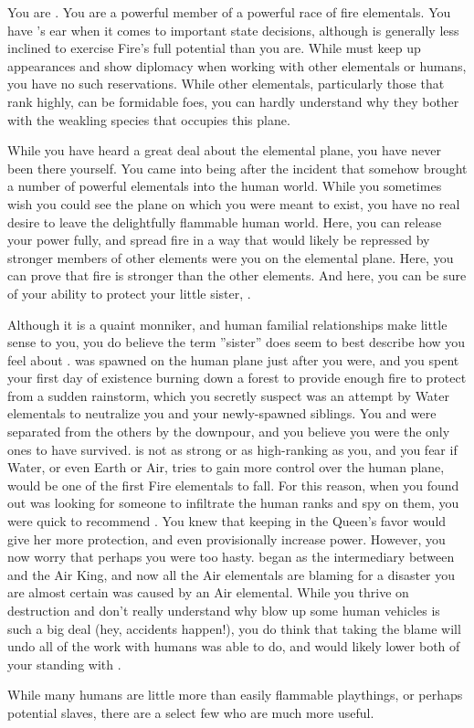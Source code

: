 \documentclass[char]{elementals}
\begin{document}
\name{\cPyro{}}

You are \cPyro{\intro}.  You are a powerful member of a powerful race of fire elementals.  You have \cfireQueen{\intro}'s ear when it comes to important state decisions, although \cfireQueen{\they} is generally less inclined to exercise Fire's full potential than you are.  While \cfireQueen{\they} must keep up appearances and show diplomacy when working with other elementals or humans, you have no such reservations.  While other elementals, particularly those that rank highly, can be formidable foes, you can hardly understand why they bother with the weakling species that occupies this plane.

While you have heard a great deal about the elemental plane, you have never been there yourself.  You came into being after the incident that somehow brought a number of powerful elementals into the human world.  While you sometimes wish you could see the plane on which you were meant to exist, you have no real desire to leave the delightfully flammable human world.  Here, you can release your power fully, and spread fire in a way that would likely be repressed by stronger members of other elements were you on the elemental plane.  Here, you can prove that fire is stronger than the other elements.  And here, you can be sure of your ability to protect your little sister, \cjuliet{\intro}.

Although it is a quaint monniker, and human familial relationships make little sense to you, you do believe the term ''sister'' does seem to best describe how you feel about \cjuliet{}.  \cjuliet{\they} was spawned on the human plane just after you were, and you spent your first day of existence burning down a forest to provide enough fire to protect \cjuliet{\them} from a sudden rainstorm, which you secretly suspect was an attempt by Water elementals to neutralize you and your newly-spawned siblings.  You and \cjuliet{} were separated from the others by the downpour, and you believe you were the only ones to have survived. \cjuliet{\they} is not as strong or as high-ranking as you, and you fear if Water, or even Earth or Air, tries to gain more control over the human plane, \cjuliet{\they} would be one of the first Fire elementals to fall. For this reason, when you found out \cfireQueen{} was looking for someone to infiltrate the human ranks and spy on them, you were quick to recommend \cjuliet{}.  You knew that keeping \cjuliet{\them} in the Queen's favor would give her more protection, and even provisionally increase  power.  However, you now worry that perhaps you were too hasty.  \cjuliet began as the intermediary between \cfireQueen and the Air King, and now all the Air elementals are blaming \cjuliet{\them} for a disaster you are almost certain was caused by an Air elemental.  While you thrive on destruction and don't really understand why blow up some human vehicles is such a big deal (hey, accidents happen!), you do think that \cjuliet{} taking the blame will undo all of the work with humans \cjuliet{\they} was able to do, and would likely lower both of your standing with \cfireQueen{}.

While many humans are little more than easily flammable playthings, or perhaps potential slaves, there are a select few who are much more useful.  

\end{document}
